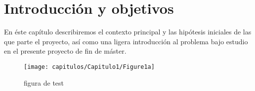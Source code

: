 \graphicspath{{capitulos/Capitulo2-Definicion-del-problema/recursos/}}

\section{Introducción y objetivos}

En éste capítulo describiremos el contexto principal y las hipótesis iniciales de las que parte el proyecto, así como una ligera introducción al problema bajo estudio en el presente proyecto de fin de máster.

\begin{figure}
	\centering
	\texttt{[image: capitulos/Capitulo1/Figure1a]}
	\caption{ figura de test}
	\label{fig:figure1a}
\end{figure}
